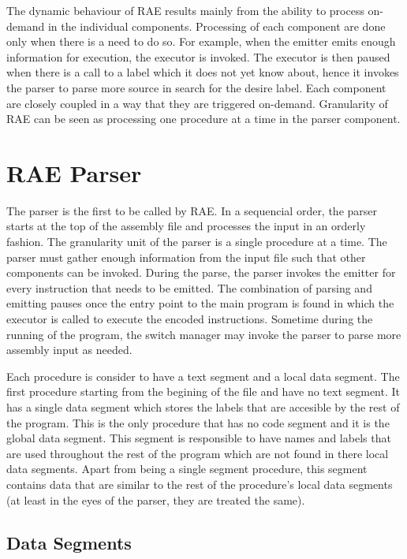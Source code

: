 The dynamic behaviour of RAE results mainly from the ability to process
on-demand in the individual components.  Processing of each component are
done only when there is a need to do so.  For example, when the emitter
emits enough information for execution, the executor is invoked.  The
executor is then paused when there is a call to a label which it does not
yet know about, hence it invokes the parser to parse more source in search
for the desire label.  Each component are closely coupled in a way that
they are triggered on-demand.  Granularity of RAE can be seen as
processing one procedure at a time in the parser component. 


\section{RAE Parser} 
The parser is the first to be called by RAE.  
In a sequencial order, the parser starts at the top of the assembly file and
processes the input in an orderly fashion.  
The granularity unit of the parser is a single procedure at a time.  
The parser must gather enough information from the input file such that other
components can be invoked.  
During the parse, the parser invokes the emitter for every instruction that 
needs to be emitted.  
The combination of parsing and emitting pauses once the entry point to the 
main program is found in which the executor is called to execute the encoded
instructions.
Sometime during the running of the program, the switch manager may invoke the 
parser to parse more assembly input as needed.

Each procedure is consider to have a text segment and a local data segment.  
The first procedure
starting from the begining of the file and have no text segment.  It has a
single data segment which stores the labels that are accesible by the rest
of the program.  This is the only procedure that has no code segment and
it is the global data segment.  This segment is responsible to have names
and labels that are used throughout the rest of the program which are not
found in there local data segments.  Apart from being a single segment
procedure, this segment contains data that are similar to the rest of the
procedure's local data segments (at least in the eyes of the parser, they
are treated the same). 


\subsection{Data Segments} 


